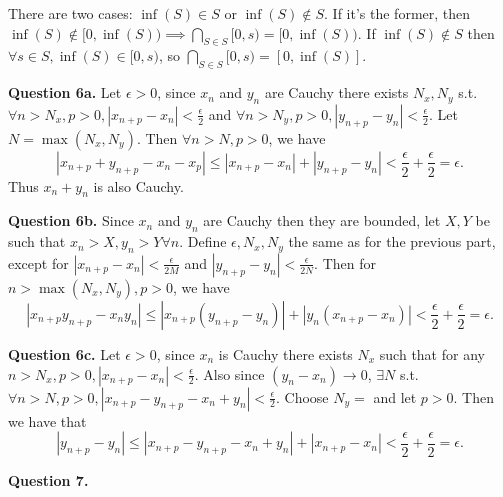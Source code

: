 \documentclass[letterpaper, reqno,11pt]{article}
\begin{document}
There are two cases: $\inf(S)\in S$ or $\inf(S)\notin S$. If it's the former, then $\inf(S)\notin [0,\inf(S))\implies \bigcap_{S\in S}[0,s)=[0,\inf(S))$. If $\inf(S)\notin S$ then $\forall s\in S, \inf(S)\in [0,s)$, so $\bigcap_{S\in S}[0,s)=[0,\inf(S)]$.

\newpage\phantom{blabla}
\newpage

{\medskip\noindent\bf Question 6a.} Let $\epsilon>0$, since $x_n$ and $y_n$ are Cauchy there exists $N_x,N_y$ s.t. $\forall n>N_x, p>0, |x_{n+p}-x_n|< \frac{\epsilon}{2}$ and $\forall n>N_y, p>0, |y_{n+p}-y_n|< \frac{\epsilon}{2}$. Let $N=\max(N_x,N_y)$. Then $\forall n>N, p>0$, we have
\[
\left| x_{n+p}+y_{n+p}-x_n-x_p \right|\leq \left| x_{n+p}-x_n \right| +\left| y_{n+p}-y_n \right| <\frac{\epsilon}{2}+\frac{\epsilon}{2}=\epsilon
.\]
Thus $x_n+y_n$ is also Cauchy.

{\medskip\noindent\bf Question 6b.} Since $x_n$ and $y_n$ are Cauchy then they are bounded, let $X,Y$ be such that $x_n>X,y_n>Y\forall n$. Define $\epsilon,N_x,N_y$ the same as for the previous part, except for $|x_{n+p}-x_n|<\frac{\epsilon}{2M}$ and $|y_{n+p}-y_n|<\frac{\epsilon}{2N}$. Then for $n>\max(N_x,N_y),p>0$, we have
\[
\left| x_{n+p}y_{n+p}-x_ny_n \right| \leq \left| x_{n+p}(y_{n+p}-y_n) \right| +\left| y_n\left( x_{n+p}-x_n \right)  \right| < \frac{\epsilon}{2}+\frac{\epsilon}{2}=\epsilon
.\]

{\medskip\noindent\bf Question 6c.} Let $\epsilon>0$, since $x_n$ is Cauchy there exists $N_x$ such that for any $n>N_x, p>0, |x_{n+p}-x_n|<\frac{\epsilon}{2}$. Also since $(y_n-x_n)\to 0$, $\exists N$ s.t. $\forall n>N,p>0,|x_{n+p}-y_{n+p}-x_{n}+y_{n}|<\frac{\epsilon}{2}$. Choose $N_y=$ and let $p>0$. Then we have that
\[
\left| y_{n+p}-y_n \right| \leq |x_{n+p}-y_{n+p}-x_{n}+y_{n}| + \left| x_{n+p}-x_{n} \right|<\frac{\epsilon}{2}+\frac{\epsilon}{2}=\epsilon
.\]

{\medskip\noindent\bf Question 7.} 
\end{document}
